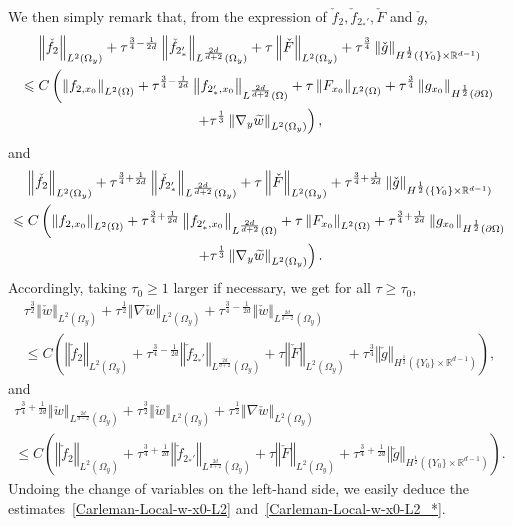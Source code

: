 \documentclass[10pt]{amsart}
\theoremstyle{definition}\newtheorem{defi}[theo]{Definition}\newtheorem{rema}[theo]{Remark}\newtheorem{exam}[theo]{Example}\newtheorem{exem}[theo]{Example}\newtheorem{nota}[theo]{Notation}
\newcommand*\R{\mathbb{R}}
\newcommand{\norm}[1]{\left\Vert#1\right\Vert}
\renewcommand{\leq}{\leqslant}
\renewcommand{\geq}{\geqslant}
\renewcommand{\tilde}{\widetilde}
\let\oldtilde\tilde
\renewcommand*{\tilde}[1]{\mathchoice{\widetilde{#1}}{\widetilde{#1}}{\oldtilde{#1}}{\oldtilde{#1}}}
\begin{document}
We then simply remark that, from the expression of $\check f_2, \check f_{2_*'}, \check F$ and $\check g$,
\begin{multline*}
\norm{\check f_2 }_{L^2(\Omega_y)} +
\tau^{\frac{3}{4} -\frac{1}{2d}} \norm{\check f_{2_*'}}_{L^{\frac{2d}{d+2}}(\Omega_y)} +
\tau \norm{\check F}_{L^2(\Omega_y)} +
\tau^{\frac{3}{4}} \norm{\check g}_{H^{\frac{1}{2}}\left(\{Y_0\} \times \R^{d-1}\right)}
\\
\leq C
\left(
\norm{ f_{2,x_0}}_{L^2(\Omega)} +
\tau^{\frac{3}{4}-\frac{1}{2d}} \norm{f_{2_*',x_0}}_{L^{\frac{2d}{d+2}}(\Omega)} +
\tau \norm{F_{x_0}}_{L^2(\Omega)} +
\tau^{\frac{3}{4}} \norm{g_{x_0}}_{H^{\frac{1}{2}}(\partial \Omega)}
\right.\\
\left. +
\tau^{\frac{1}{3}} \norm{\nabla_y \tilde w}_{L^2(\Omega_y)}\right),
\end{multline*}
and
\begin{multline*}
\norm{ \check f_2}_{L^2(\Omega_y)} +
\tau^{\frac{3}{4}+\frac{1}{2d}} \norm{ \check f_{2_*'} }_{L^{\frac{2d}{d+2}}(\Omega_y)} +
\tau \norm{\check F }_{L^2(\Omega_y)} +
\tau^{\frac{3}{4}+\frac{1}{2d}} \norm{\check g}_{H^{\frac{1}{2}}\left(\{Y_0\} \times \R^{d-1}\right)}\\
\leq C
\left(\norm{f_{2,x_0}}_{L^2(\Omega)} +
\tau^{\frac{3}{4}+\frac{1}{2d}} \norm{ f_{2_*',x_0}}_{L^{\frac{2d}{d+2}}(\Omega)} +
\tau \norm{F_{x_0}}_{L^2(\Omega)} +
\tau^{\frac{3}{4}+\frac{1}{2d}} \norm{g_{x_0}}_{H^{\frac{1}{2}}(\partial \Omega)} \right.\\ \left.+
\tau^{\frac{1}{3}} \norm{\nabla_y \tilde w}_{L^2(\Omega_y)}\right).
\end{multline*}
Accordingly, taking $\tau_0\geq 1$ larger if necessary, we get for all $\tau \geq \tau_0$,
\begin{multline*}
\tau^{\frac{3}{2}} \norm{\check w}_{L^2(\Omega_y)} +
\tau^{\frac{1}{2}} \norm{\nabla \check w}_{L^2(\Omega_y)} +
\tau^{\frac{3}{4}- \frac{1}{2d}} \norm{\check w }_{L^{\frac{2d}{d-2}}(\Omega_y)}
\\
\leq C\left(
\norm{ \check f_2 }_{L^2(\Omega_y)} +
\tau^{\frac{3}{4}- \frac{1}{2d}} \norm{\check f_{2_*'} }_{L^{\frac{2d}{d+2}}(\Omega_y)} +
\tau \norm{\check F}_{L^2(\Omega_y)} +
\tau^{\frac{3}{4}} \norm{\check g}_{H^{\frac{1}{2}}\left(\{Y_0\} \times \R^{d-1}\right)}
\right),
\end{multline*}
and
\begin{multline*}
\tau^{\frac{3}{4}+ \frac{1}{2d}} \norm{\check w}_{L^{\frac{2d}{d-2}}(\Omega_y)} +
\tau^{\frac{3}{2}} \norm{\check w}_{L^2(\Omega_y)} +
\tau^{\frac{1}{2}} \norm{\nabla \check w }_{L^2(\Omega_y)}
\\
\leq C\left(
\norm{\check f_2}_{L^2(\Omega_y)} +
\tau^{\frac{3}{4}+ \frac{1}{2d}} \norm{\check f_{2_*'}}_{L^{\frac{2d}{d+2}}(\Omega_y)} +
\tau \norm{\check F}_{L^2(\Omega_y)} +
\tau^{\frac{3}{4}+\frac{1}{2d}} \norm{\check g}_{H^{\frac{1}{2}}\left(\{Y_0\} \times \R^{d-1}\right)}
\right).
\end{multline*}
Undoing the change of variables on the left-hand side, we easily deduce the estimates~\eqref{Carleman-Local-w-x0-L2} and~\eqref{Carleman-Local-w-x0-L2_*}.
\end{document}
